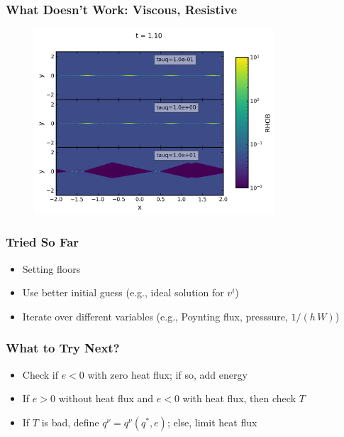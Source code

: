 \documentclass{beamer}
\begin{document}
\begin{frame}
\frametitle{What Doesn't Work: Viscous, Resistive}

  \begin{figure}[htb!]
    \centering
    \includegraphics[width=0.8\textwidth]{fig.HarrisSheet.png}
  \end{figure}

\end{frame}

\begin{frame}
\frametitle{Tried So Far}

  \begin{itemize}
    \item Setting floors
    \item Use better initial guess (e.g., ideal solution for $v^{i}$)
    \item Iterate over different variables (e.g., Poynting flux, presssure,
          $1/(h\,W)$)
  \end{itemize}

\end{frame}

\begin{frame}
\frametitle{What to Try Next?}

  \begin{itemize}
    \item Check if $e<0$ with zero heat flux; if so, add energy
    \item If $e>0$ without heat flux and $e<0$ with heat flux, then check $T$
    \item If $T$ is bad, define $q^{\nu} = q^{\nu}\left(q^{*},e\right)$;
    else, limit heat flux
  \end{itemize}

\end{frame}
\end{document}
